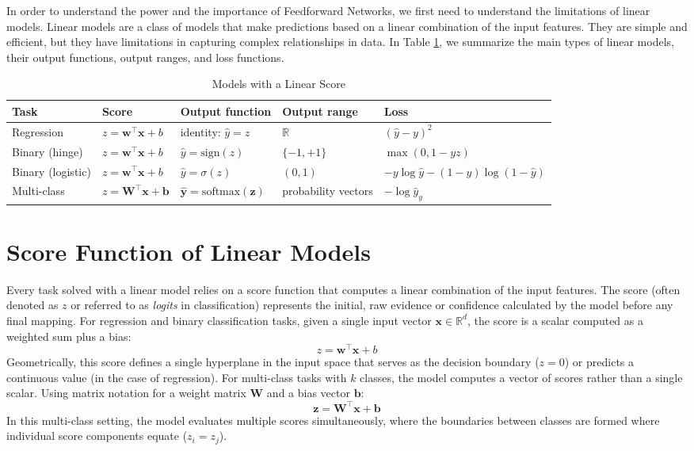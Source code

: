 In order to understand the power and the importance of Feedforward Networks, we first need to understand
the limitations of linear models. Linear models are a class of models that make predictions 
based on a linear combination of the input features. They are simple and efficient, but they 
have limitations in capturing complex relationships in data. In Table \ref{tab:linear_models}, we 
summarize the main types of linear models, their output functions, output ranges, and loss functions.
\begin{table}[htbp]
  \centering
  \small
  \begin{tabular}{lllll}
    \toprule
    \textbf{Task} & \textbf{Score} & \textbf{Output function} & \textbf{Output range} & \textbf{Loss} \\
    \midrule
    Regression & $z = \mathbf{w}^{\top}\mathbf{x} + b$ & identity: $\hat{y} = z$ & $\mathbb{R}$ & $(\hat{y} - y)^2$ \\
    Binary (hinge) & $z = \mathbf{w}^{\top}\mathbf{x} + b$ & $\hat{y} = \text{sign}(z)$ & $\{-1, +1\}$ & $\max(0, 1 - y z)$ \\
    Binary (logistic) & $z = \mathbf{w}^{\top}\mathbf{x} + b$ & $\hat{y} = \sigma(z)$ & $(0, 1)$ & $-y \log \hat{y} - (1 - y) \log(1 - \hat{y})$ \\
    Multi-class & $z = \mathbf{W}^{\top}\mathbf{x} + \mathbf{b}$ & $\hat{\mathbf{y}} = \text{softmax}(\mathbf{z})$ & probability vectors & $-\log \hat{y}_y$ \\
    \bottomrule
  \end{tabular}
    \caption{Models with a Linear Score}
    \label{tab:linear_models}
\end{table}
\section{Score Function of Linear Models}
Every task solved with a linear model relies on a score function that computes a linear combination 
of the input features. The score (often denoted as $z$ or referred to as \textit{logits} in 
classification) represents the initial, raw evidence or confidence calculated by the model before
any final mapping. For regression and binary classification tasks, given a single input vector 
$\mathbf{x} \in \mathbb{R}^d$, the score is a scalar computed as a weighted sum plus a bias:
\begin{equation}
    z = \mathbf{w}^{\top}\mathbf{x} + b
\end{equation}
Geometrically, this score defines a single hyperplane in the input space that serves as the decision 
boundary ($z = 0$) or predicts a continuous value (in the case of regression). 
\newline
For multi-class tasks with $k$ classes, the model 
computes a vector of scores rather than a single scalar. Using matrix notation for a weight 
matrix $\mathbf{W}$ and a bias vector $\mathbf{b}$:
\begin{equation}
    \mathbf{z} = \mathbf{W}^{\top}\mathbf{x} + \mathbf{b}
\end{equation}
In this multi-class setting, the model evaluates multiple scores simultaneously, where the boundaries 
between classes are formed where individual score components equate ($z_i = z_j$).

